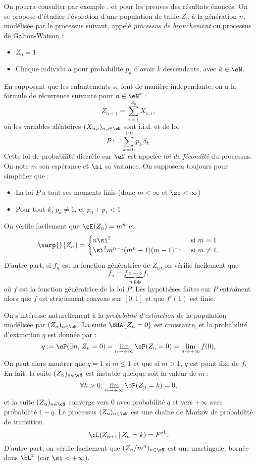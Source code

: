 {{On pourra consulter par exemple \cite{harris-63}, \cite{harris-fr} et
\cite{williams} pour les preuves des résultats énoncés. On se propose
d'étudier l'évolution d'une population de taille $Z_n$ à la génération
$n$, modélisée par le processus suivant, appelé \emph{processus de
  branchement} ou processus de Galton-Watson :
\begin{itemize}
\item $Z_0=1$.
\item Chaque individu a pour probabilité $p_k$ d'avoir $k$ descendants, avec
  $k\in\eN$.
\end{itemize}
En supposant que les enfantements se font de manière indépendante, on
a la formule de récurrence suivante pour $n\in\eN^*$ :
$$
Z_{n+1}=\sum_{i=1}^{Z_n} X_{n,i},
$$
où les variables aléatoires $(X_{n,i})_{n,i\in\eN}$ sont i.i.d. et
de loi
$$
P:=\sum_{k=0}^{+\infty} p_k\,\delta_k. 
$$
Cette loi de probabilité discrète sur $\eN$ est appelée \emph{loi
  de fécondité} du processus. On note $m$ son espérance et $\si$ sa
variance.  On supposera toujours pour simplifier que :
\begin{itemize}
\item La loi $P$ a tout ses moments finis (donc $m<\infty$ et
  $\si<\infty$)
\item Pour tout $k$, $p_k\neq 1$, et $p_0+p_1<1$
\end{itemize}
On vérifie facilement que $\eE(Z_n)=m^n$ et 
$$
\varp{}{Z_n}=
\begin{cases}
  n\si^2 & \text{ si $m=1$}\\
  \si^2m^{n-1}(m^n-1)(m-1)^{-1} & \text{ si $m\neq 1$}.
\end{cases}
$$
D'autre part, si $f_n$ est la fonction génératrice de $Z_n$, on
vérifie facilement que
$$
f_n=\underbrace{f\circ \cdots \circ f}_{n \text{ fois}},
$$
où $f$ est la fonction génératrice de la loi $P$. Les hypothèses
faites sur $P$ entraînent alors que $f$ est strictement convexe sur
$[0,1]$ et que $f'(1)$ est finie.

On s'intéresse naturellement à la \emph{probabilité d'extinction} de
la population modélisée par $(Z_n)_{n\in\eN}$.  La suite $\BRA{Z_n=0}$
est croissante, et la probabilité d'extinction $q$ est donnée par :
$$
q:=\eP(\exists n,\,Z_n=0) =\lim_{n\to+\infty} \eP(Z_n=0)
=\lim_{n\to+\infty} f(0),
$$
On peut alors montrer que $q=1$ si $m\leq 1$ et que si $m>1$, $q$ est point
fixe de $f$. En fait, la suite $(Z_n)_{n\in\eN}$ est instable quelque soit la
valeur de $m$ :
$$
\forall k>0,\,\lim_{n\to+\infty}\eP(Z_n=k)=0, 
$$
et la suite $(Z_n)_{n\in\eN}$ converge vers $0$ avec probabilité $q$ et
vers $+\infty$ avec probabilité $1-q$. Le processus $(Z_n)_{n\in\eN}$ est une
chaîne de Markov de probabilité de transition
$$
\cL(Z_{n+1}\,\vert\,Z_n=k)=P^{*k}.
$$
D'autre part, on vérifie facilement que $(Z_n/m^n)_{n\in\eN}$ est une
martingale, bornée dans $\bL^2$ (car $\si<+\infty$).

}}
